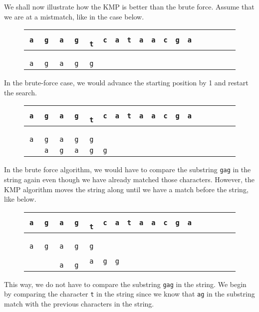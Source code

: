 \documentclass[a4paper, openany]{memoir}
\begin{document}
We shall now illustrate how the KMP is better than the brute force. Assume that we are at a mistmatch, like in the case below.
\begin{figure}[H]
    \centering
    \begin{tabular}{cccccccccccccccccc}
        \texttt{a} & \texttt{g} & \texttt{a} & \texttt{g} & \texttt{{\color{gray} t}} & \texttt{c} & \texttt{a} & \texttt{t} & \texttt{a} & \texttt{a} & \texttt{c} & \texttt{g} & \texttt{a} \\
        \hline
         \texttt{{\color{brown} a}} & \texttt{{\color{brown} g}} & \texttt{{\color{brown} a}} &  \texttt{{\color{brown} g}} &  \texttt{{\color{red} g}}
    \end{tabular}
\end{figure}
\noindent In the brute-force case, we would advance the starting position by 1 and restart the search.
\begin{figure}[H]
    \centering
    \begin{tabular}{cccccccccccccccccc}
        \texttt{a} & \texttt{g} & \texttt{a} & \texttt{g} & \texttt{{\color{gray} t}} & \texttt{c} & \texttt{a} & \texttt{t} & \texttt{a} & \texttt{a} & \texttt{c} & \texttt{g} & \texttt{a} \\
        \hline
         \texttt{{\color{brown} a}} & \texttt{{\color{brown} g}} & \texttt{{\color{brown} a}} &  \texttt{{\color{brown} g}} &  \texttt{{\color{red} g}} \\
        & \texttt{a} & \texttt{g} & \texttt{a} & \texttt{g} & \texttt{g} 
    \end{tabular}
\end{figure}
\noindent In the brute force algorithm, we would have to compare the substring \texttt{gag} in the string again even though we have already matched those characters. However, the KMP algorithm moves the string along until we have a match before the string, like below.
\begin{figure}[H]
    \centering
    \begin{tabular}{cccccccccccccccccc}
        \texttt{a} & \texttt{g} & \texttt{a} & \texttt{g} & \texttt{{\color{gray} t}} & \texttt{c} & \texttt{a} & \texttt{t} & \texttt{a} & \texttt{a} & \texttt{c} & \texttt{g} & \texttt{a} \\
        \hline
         \texttt{{\color{brown} a}} & \texttt{{\color{brown} g}} & \texttt{{\color{brown} a}} &  \texttt{{\color{brown} g}} & \texttt{{\color{red} g}} \\
        & & \texttt{{\color{brown} a}} & \texttt{{\color{brown} g}} & \texttt{a} & \texttt{g} & \texttt{g} 
    \end{tabular}
\end{figure}
\noindent This way, we do not have to compare the substring \texttt{gag} in the string. We begin by comparing the character \texttt{t} in the string since we know that \texttt{ag} in the substring match with the previous characters in the string.
\end{document}
